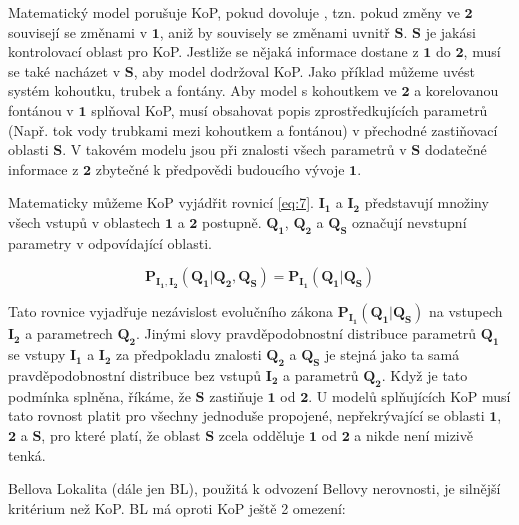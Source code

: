 Matematický model porušuje KoP, pokud dovoluje , tzn. pokud změny ve $\bm{2}$ souvisejí se změnami v $\bm{1}$, aniž by souvisely se změnami uvnitř $\bm{S}$. $\bm{S}$ je jakási kontrolovací oblast pro KoP. Jestliže se nějaká informace dostane z $\bm{1}$ do $\bm{2}$, musí se také nacházet v $\bm{S}$, aby model dodržoval KoP. Jako příklad můžeme uvést systém kohoutku, trubek a fontány. Aby model s kohoutkem ve $\bm{2}$ a korelovanou fontánou v $\bm{1}$ splňoval KoP, musí obsahovat popis zprostředkujících parametrů (Např. tok vody trubkami mezi kohoutkem a fontánou) v přechodné zastiňovací oblasti $\bm{S}$. V takovém modelu jsou při znalosti všech parametrů v $\bm{S}$ dodatečné informace z $\bm{2}$ zbytečné k předpovědi budoucího vývoje $\bm{1}$.

Matematicky můžeme KoP vyjádřit rovnicí \ref{eq:7}. $\bm{I_{1}}$ a $\bm{I_{2}}$ představují množiny všech vstupů v oblastech $\bm{1}$ a $\bm{2}$ postupně. $\bm{Q_{1}}$, $\bm{Q_{2}}$ a $\bm{Q_{S}}$ označují nevstupní parametry v odpovídající oblasti.

\begin{equation}
    \bm{P_{I_{1},I_{2}}(Q_{1}|Q_{2}, Q_{S}) = P_{I_{1}}(Q_{1}|Q_{S})}
    \label{eq:7}
\end{equation}

Tato rovnice vyjadřuje nezávislost evolučního zákona $\bm{P_{I_{1}}(Q_{1}|Q_{S})}$ na vstupech $\bm{I_{2}}$ a parametrech $\bm{Q_{2}}$. Jinými slovy pravděpodobnostní distribuce parametrů $\bm{Q_{1}}$ se vstupy $\bm{I_{1}}$ a $\bm{I_{2}}$ za předpokladu znalosti $\bm{Q_{2}}$ a $\bm{Q_{S}}$ je stejná jako ta samá pravděpodobnostní distribuce bez vstupů $\bm{I_{2}}$ a parametrů $\bm{Q_{2}}$. Když je tato podmínka splněna, říkáme, že $\bm{S}$ zastiňuje $\bm{1}$ od $\bm{2}$. U modelů splňujících KoP musí tato rovnost platit pro všechny jednoduše propojené, nepřekrývající se oblasti $\bm{1}$, $\bm{2}$ a $\bm{S}$, pro které platí, že oblast $\bm{S}$ zcela odděluje $\bm{1}$ od $\bm{2}$ a nikde není mizivě tenká.

Bellova Lokalita (dále jen BL), použitá k odvození Bellovy nerovnosti, je silnější kritérium než KoP. BL má oproti KoP ještě 2 omezení:


